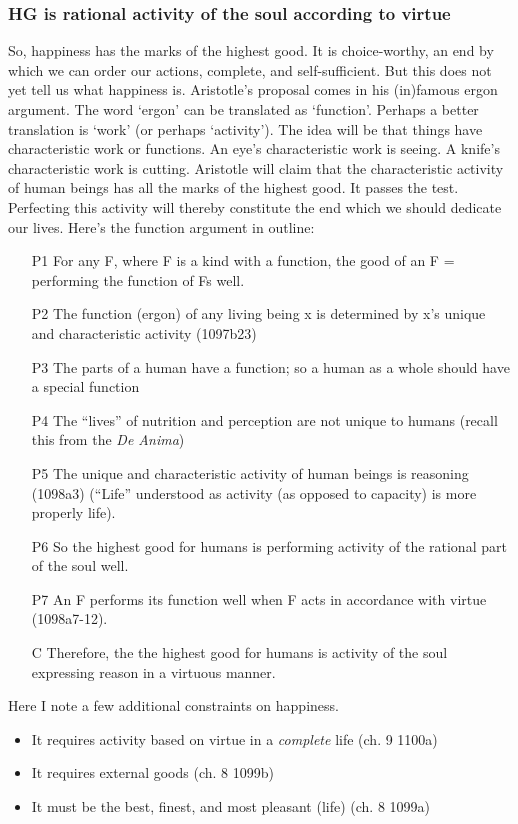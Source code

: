 \documentclass[oneside]{article}
\begin{document}
\subsubsection*{HG is rational activity of the soul according to virtue}

So, happiness has the marks of the highest good. It is choice-worthy, an end by which we can order our actions, complete, and self-sufficient. But this does not yet tell us what happiness is. Aristotle's proposal comes in his (in)famous ergon argument. The word `ergon' can be translated as `function'. Perhaps a better translation is `work' (or perhaps `activity'). The idea will be that things have characteristic work or functions. An eye's characteristic work is seeing. A knife's characteristic work is cutting. Aristotle will claim that the characteristic activity of human beings has all the marks of the highest good. It passes the test. Perfecting this activity will thereby constitute the end which we should dedicate our lives. Here's the function argument in outline: 

\begin{enumerate}
\item[P1] For any F, where F is a kind with a function, the good of an F = performing the function of Fs well.
\item[P2] The function (ergon) of any living being x is determined by x's unique and  characteristic activity (1097b23)
\item[P3] The parts of a human have a function; so a human as a whole should have a special function
\item[P4] The ``lives'' of nutrition and perception are not unique to humans (recall this from the \emph{De Anima})
\item[P5] The unique and characteristic activity of human beings is reasoning (1098a3) (``Life'' understood as activity (as opposed to capacity) is more properly life).
\item[P6] So the highest good for humans is performing activity of the rational part of the soul well.
\item[P7] An F performs its function well when F acts in accordance with virtue (1098a7-12).
\item[C] Therefore, the the highest good for humans is activity of the soul expressing reason in a virtuous manner.  
\end{enumerate}
Here I note a few additional constraints on happiness.\begin{itemize}
\item It requires activity based on virtue in a \emph{complete} life (ch. 9 1100a)
\item It requires external goods (ch. 8 1099b)
\item It must be the best, finest, and most pleasant (life) (ch. 8 1099a)
\end{itemize}
\end{document}
